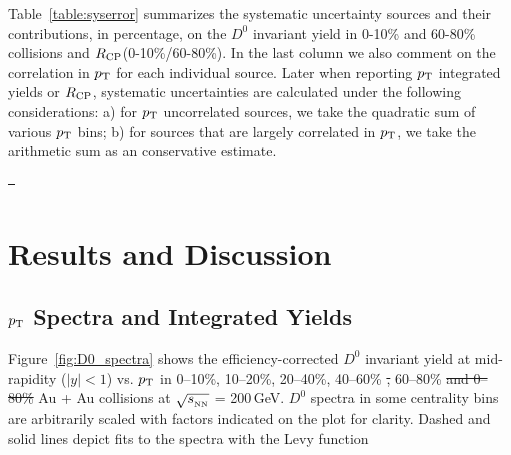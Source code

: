 \documentclass[%
 reprint,	
 amsmath,amssymb,
 aps,
 prc,
]{revtex4-1}
\providecommand{\DIFaddtex}[1]{{\protect\color{blue}\uwave{#1}}} %
\providecommand{\DIFdeltex}[1]{{\protect\color{red}\sout{#1}}}                      %
\providecommand{\DIFaddbegin}{} %
\providecommand{\DIFaddend}{} %
\providecommand{\DIFdelbegin}{} %
\providecommand{\DIFdelend}{} %
\providecommand{\DIFadd}[1]{\texorpdfstring{\DIFaddtex{#1}}{#1}} %
\providecommand{\DIFdel}[1]{\texorpdfstring{\DIFdeltex{#1}}{}} %
\begin{document}
Table~\ref{table:syserror} summarizes the systematic uncertainty sources and their contributions, in percentage, on the $D^0$ invariant yield in 0-10\% and 60-80\% collisions and $R_{\rm CP}$(0-10\%/60-80\%). In the last column we also comment on the correlation in $p_{\rm T}$ for each individual source. Later when reporting $p_{\rm T}$ integrated yields or $R_{\rm CP}$, systematic uncertainties are calculated under the following considerations: a) for $p_{\rm T}$ uncorrelated sources, we take the quadratic sum of various $p_{\rm T}$ bins; b) for sources that are largely correlated in $p_{\rm T}$, we take the arithmetic sum as an conservative estimate.


\DIFdelbegin \DIFdel{\
}\DIFdelend \DIFaddbegin 

\DIFaddend \section{\label{result}Results and Discussion}

\subsection{\label{result:pt}$p_{\rm T}$ Spectra and Integrated Yields}
Figure~\ref{fig:D0_spectra} shows the efficiency-corrected $D^0$ invariant yield at mid-rapidity ($|y|<1$) vs. $p_{\rm T}$ in 0--10\%, 10--20\%, 20--40\%, 40--60\% \DIFdelbegin \DIFdel{, }\DIFdelend \DIFaddbegin \DIFadd{and }\DIFaddend 60--80\% \DIFdelbegin \DIFdel{and 0--80\% }\DIFdelend Au + Au collisions at $\sqrt{s_{_{\rm NN}}}$ = 200\,GeV. $D^0$ spectra in some centrality bins are arbitrarily scaled with factors indicated on the plot for clarity. Dashed and solid lines depict fits to the spectra with the Levy function
\end{document}
